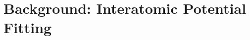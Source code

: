 \chapter{Background: Interatomic Potential Fitting}

\begin{changemargin}{1.0cm}{1.0cm}
\end{changemargin}





































